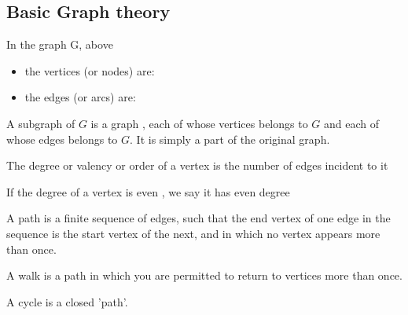 \documentclass[a4paper]{article}
\begin{document}
\subsection{Basic Graph theory}
\begin{defi}
	In the graph G, above
	\begin{itemize}
		\item the vertices (or nodes) are:
		\item the edges (or arcs) are:
	\end{itemize}
\end{defi}

\begin{defi}[Subgraph]
	A subgraph of $G$ is a graph , each of whose vertices belongs to $G$ and each of whose edges belongs to $G$. It is simply a part of the original graph.
\end{defi}

\begin{defi}[Degree]
	The degree or valency or order of a vertex is the number of edges incident to it
\end{defi}

\begin{prop}
	If the degree of a vertex is even , we say it has even degree
\end{prop}

\begin{defi}[Path]
	A path is a finite sequence of edges, such that the end vertex of one edge in the sequence is the start vertex of the next, and in which no vertex appears more than once.
\end{defi}

\begin{defi}[Walk]
	A walk is a path in which you are permitted to return to vertices more than once.
\end{defi}

\begin{defi}[Cycle]
	A cycle is a closed 'path'.
\end{defi}
\end{document}
